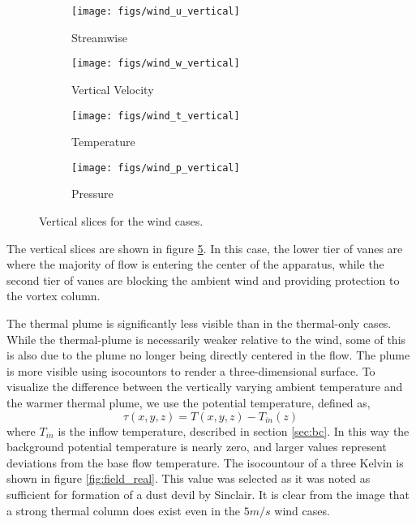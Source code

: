 %
%
\begin{figure}[htb]

 \begin{subfigure}{.5\textwidth}
  \centering
  \texttt{[image: figs/wind\_u\_vertical]}
  \caption{Streamwise}
  \label{fig:vt-wind-vert}
 \end{subfigure}%
 \begin{subfigure}{.5\textwidth}
  \centering
  \texttt{[image: figs/wind\_w\_vertical]}
  \caption{Vertical Velocity}
  \label{fig:vz-wind-vert}
 \end{subfigure}%


 \begin{subfigure}{.5\textwidth}
  \centering
  \texttt{[image: figs/wind\_t\_vertical]}
  \caption{Temperature}
  \label{fig:t-wind-vert}
 \end{subfigure}%
 \begin{subfigure}{.5\textwidth}
  \centering
  \texttt{[image: figs/wind\_p\_vertical]}
  \caption{Pressure}
  \label{fig:p-wind-vert}
 \end{subfigure}%

 \caption{Vertical slices for the wind cases.}
 \label{fig:wind-ver}
\end{figure}

The vertical slices are shown in figure \ref{fig:wind-ver}. In this
case, the lower tier of vanes are where the majority of flow is 
entering the center of the apparatus, while the second tier of vanes are
blocking the ambient wind and providing protection to the vortex column. 

The thermal plume is significantly less
visible than in the thermal-only cases. While the
thermal-plume is necessarily weaker relative to the wind, some of this
is also due to the plume no longer being directly centered in the
flow. The plume is more visible using isocountors to render a
three-dimensional surface. 
To visualize the difference between the vertically varying ambient temperature
and the warmer thermal plume, we use the potential temperature, defined
as, 
\begin{equation}
  \tau(x,y,z) = T(x,y,z) -T_{in}(z) 
   \label{eqn:tau}
\end{equation}
where $T_{in}$ is the inflow temperature, described
in section \ref{sec:bc}. In this way the background potential
temperature is nearly zero, and larger values represent deviations from
the base flow temperature. The isocountour of a three Kelvin is 
shown in figure \ref{fig:field_real}. This value was selected as
it was noted as sufficient for formation of a dust devil by
Sinclair\cite{Sinclair1969}. It is clear from the image that a 
strong thermal column does exist even in the $5 m/s$ wind cases. 

